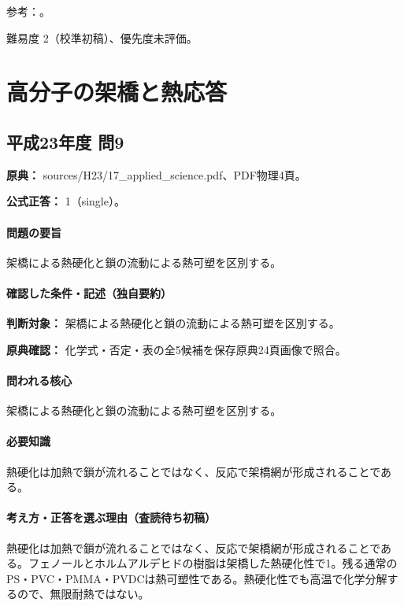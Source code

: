 \par 参考：\cite{organic_step}。

\par 難易度 2（校準初稿）、優先度未評価。

\section{高分子の架橋と熱応答}

\subsection{平成23年度 問9}
\label{q:h23-reg-applied-09}

\noindent\textbf{原典：} sources/H23/17\_applied\_science.pdf、PDF物理4頁。

\textbf{公式正答：} 1（single）。

\paragraph{問題の要旨} 架橋による熱硬化と鎖の流動による熱可塑を区別する。

\paragraph{確認した条件・記述（独自要約）}\mbox{}\par

\noindent\textbf{判断対象：} 架橋による熱硬化と鎖の流動による熱可塑を区別する。\par

\noindent\textbf{原典確認：} 化学式・否定・表の全5候補を保存原典24頁画像で照合。\par

\paragraph{問われる核心} 架橋による熱硬化と鎖の流動による熱可塑を区別する。

\paragraph{必要知識} 熱硬化は加熱で鎖が流れることではなく、反応で架橋網が形成されることである。

\paragraph{考え方・正答を選ぶ理由（査読待ち初稿）} 熱硬化は加熱で鎖が流れることではなく、反応で架橋網が形成されることである。フェノールとホルムアルデヒドの樹脂は架橋した熱硬化性で1。残る通常のPS・PVC・PMMA・PVDCは熱可塑性である。熱硬化性でも高温で化学分解するので、無限耐熱ではない。

